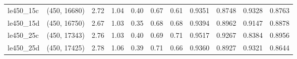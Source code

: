 \begin{tabular}{llrrrrrrrrr}
 le450\_15c & (450, 16680) &  2.72 & 1.04 & 0.40 &  0.67 &   0.61 &   0.9351 &   0.8748 &     0.9328 &      0.8763 \\
 le450\_15d & (450, 16750) &  2.67 & 1.03 & 0.35 &  0.68 &   0.68 &   0.9394 &   0.8962 &     0.9147 &      0.8878 \\
 le450\_25c & (450, 17343) &  2.76 & 1.03 & 0.40 &  0.69 &   0.71 &   0.9517 &   0.9267 &     0.8384 &      0.8956 \\
 le450\_25d & (450, 17425) &  2.78 & 1.06 & 0.39 &  0.71 &   0.66 &   0.9360 &   0.8927 &     0.9321 &      0.8644 \\
\bottomrule
\end{tabular}

